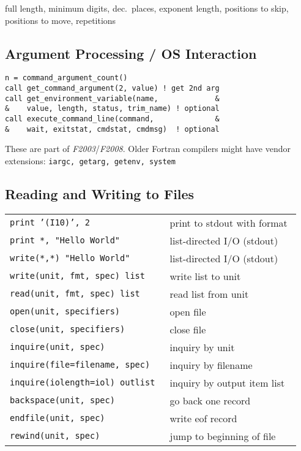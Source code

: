 \message{ !name(Cheatsheet.tex)}\documentclass[8pt]{extarticle} %
\begin{document}
\begin{multicols}{3}
  \vspace{1ex}
   full length,
   minimum digits,
   dec.\ places,
   exponent length,
   positions to skip,
   positions to move,
   repetitions

  \vspace{1ex}
  \subsection{Argument Processing / OS Interaction}
  \begin{verbatim}
n = command_argument_count()
call get_command_argument(2, value) ! get 2nd arg
call get_environment_variable(name,             &
&    value, length, status, trim_name) ! optional
call execute_command_line(command,              &
&    wait, exitstat, cmdstat, cmdmsg)  ! optional
  \end{verbatim}

  \vspace{-2ex}
  These are part of \textit{F2003}/\textit{F2008}. Older Fortran compilers might
  have vendor extensions: {\tt iargc, getarg, getenv, system}

  \subsection{Reading and Writing to Files}
  \begin{tabular}{L{0.55\linewidth} L{0.45\linewidth}}
  \tt print~'(I10)',~2                            & print to stdout with format \\
  \tt print~*,~"Hello~World"                      & list-directed I/O (stdout)\\
  \tt write(*,*)~"Hello~World"                    & list-directed I/O (stdout)\\
  \tt write(unit,~fmt,~spec)~list                 & write list to unit \\
  \tt read(unit,~fmt,~spec)~list                  & read list from unit \\
  \tt open(unit,~specifiers)                      & open file \\
  \tt close(unit,~specifiers)                     & close file \\
  \tt inquire(unit,~spec)                         & inquiry by unit \\
  \tt inquire(file=filename,~spec)                & inquiry by filename \\
  \tt inquire(iolength=iol)~outlist               & inquiry by output item list \\
  \tt backspace(unit,~spec)                       & go back one record \\
  \tt endfile(unit,~spec)                         & write eof record \\
  \tt rewind(unit,~spec)                          & jump to beginning of file
  \end{tabular}



\end{multicols}
\end{document}

